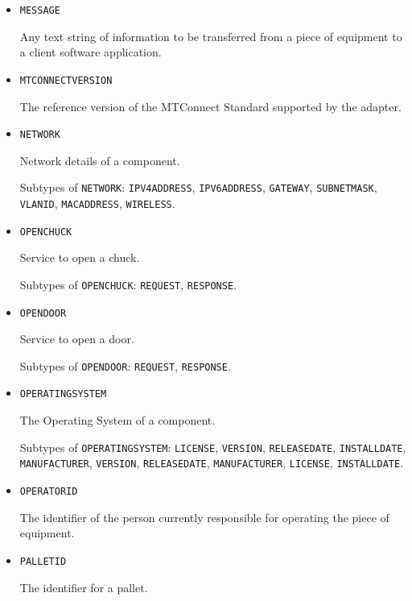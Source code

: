 \begin{itemize}
\item \texttt{MESSAGE}  

Any text string of information to be transferred from a piece of equipment to a client software application.


\item \texttt{MTCONNECT\textunderscore VERSION}  

The reference version of the MTConnect Standard supported by the \gls{adapter}.


\item \texttt{NETWORK}  

Network details of a component.

Subtypes of \texttt{NETWORK}: \texttt{IPV4\textunderscore ADDRESS}, \texttt{IPV6\textunderscore ADDRESS}, \texttt{GATEWAY}, \texttt{SUBNET\textunderscore MASK}, \texttt{VLAN\textunderscore ID}, \texttt{MAC\textunderscore ADDRESS}, \texttt{WIRELESS}.

\item \texttt{OPEN\textunderscore CHUCK}  

Service to open a chuck.

Subtypes of \texttt{OPEN\textunderscore CHUCK}: \texttt{REQUEST}, \texttt{RESPONSE}.

\item \texttt{OPEN\textunderscore DOOR}  

Service to open a door.

Subtypes of \texttt{OPEN\textunderscore DOOR}: \texttt{REQUEST}, \texttt{RESPONSE}.

\item \texttt{OPERATING\textunderscore SYSTEM}  

The Operating System of a component.

Subtypes of \texttt{OPERATING\textunderscore SYSTEM}: \texttt{LICENSE}, \texttt{VERSION}, \texttt{RELEASE\textunderscore DATE}, \texttt{INSTALL\textunderscore DATE}, \texttt{MANUFACTURER}, \texttt{VERSION}, \texttt{RELEASE\textunderscore DATE}, \texttt{MANUFACTURER}, \texttt{LICENSE}, \texttt{INSTALL\textunderscore DATE}.

\item \texttt{OPERATOR\textunderscore ID}  

The identifier of the person currently responsible for operating the piece of equipment.


\item \texttt{PALLET\textunderscore ID}  

The identifier for a pallet.



\end{itemize}
